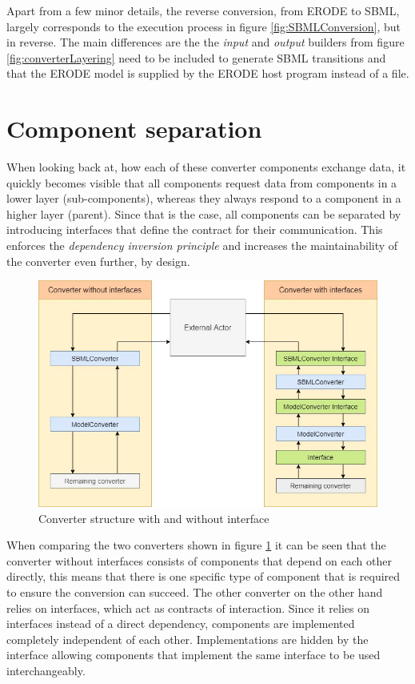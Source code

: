 Apart from a few minor details, the reverse conversion, from ERODE to SBML, largely corresponds to the execution process in figure \ref{fig:SBMLConversion}, but in reverse. The main differences are the the \emph{input} and \emph{output} builders from figure \ref{fig:converterLayering} need to be included to generate SBML transitions and that the ERODE model is supplied by the ERODE host program instead of a file.

\section{Component separation}
When looking back at, how each of these converter components exchange data, it quickly becomes visible that all components request data from components in a lower layer (sub-components), whereas they always respond to a component in a higher layer (parent). Since that is the case, all components can be separated by introducing interfaces that define the contract for their communication. This enforces the \emph{dependency inversion principle} and increases the maintainability of the converter even further, by design.
\begin{figure}[H]
    \centering
    \includegraphics[scale=0.45]{Sections/Images/Interfacing.jpg}
    \caption{Converter structure with and without interface}
    \label{fig:interfacing}
\end{figure}
When comparing the two converters shown in figure \ref{fig:interfacing} it can be seen that the converter without interfaces consists of components that depend on each other directly, this means that there is one specific type of component that is required to ensure the conversion can succeed. 
The other converter on the other hand relies on interfaces, which act as contracts of interaction. Since it relies on interfaces instead of a direct dependency, components are implemented completely independent of each other. Implementations are hidden by the interface allowing components that implement the same interface to be used interchangeably.

